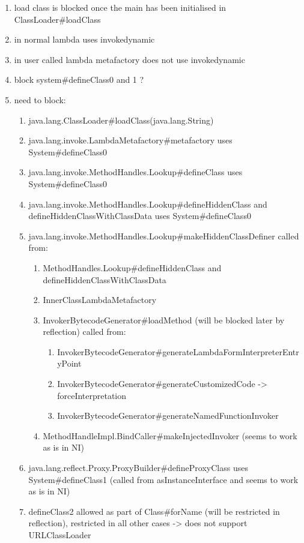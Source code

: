 \begin{enumerate}
    \item load class is blocked once the main has been initialised in ClassLoader\#loadClass
    \item in normal lambda uses invokedynamic
    \item in user called lambda metafactory does not use invokedynamic
    \item block system\#defineClass0 and 1 ?
    \item need to block: \begin{enumerate}
        \item java.lang.ClassLoader\#loadClass(java.lang.String)
        \item java.lang.invoke.LambdaMetafactory\#metafactory uses System\#defineClass0
        \item java.lang.invoke.MethodHandles.Lookup\#defineClass uses System\#defineClass0
        \item java.lang.invoke.MethodHandles.Lookup\#defineHiddenClass and defineHiddenClassWithClassData uses System\#defineClass0
        \item java.lang.invoke.MethodHandles.Lookup\#makeHiddenClassDefiner called from:
        \begin{enumerate}
            \item MethodHandles.Lookup\#defineHiddenClass and defineHiddenClassWithClassData
            \item InnerClassLambdaMetafactory
            \item InvokerBytecodeGenerator\#loadMethod (will be blocked later by reflection) called from:
            \begin{enumerate}
                \item InvokerBytecodeGenerator\#generateLambdaFormInterpreterEntryPoint
                \item InvokerBytecodeGenerator\#generateCustomizedCode -> forceInterpretation
                \item InvokerBytecodeGenerator\#generateNamedFunctionInvoker
            \end{enumerate}
            \item MethodHandleImpl.BindCaller\#makeInjectedInvoker (seems to work as is in NI)
        \end{enumerate}
        \item java.lang.reflect.Proxy.ProxyBuilder\#defineProxyClass uses System\#defineClass1 (called from asInstanceInterface and seems to work as is in NI)
    \item defineClass2 allowed as part of Class\#forName (will be restricted in reflection), restricted in all other cases -> does not support URLClassLoader
    \end{enumerate}
\end{enumerate}

